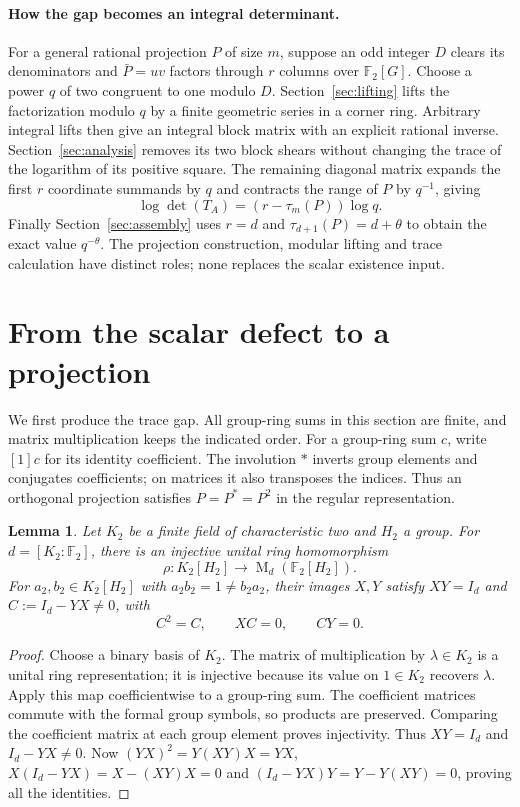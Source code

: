 \documentclass[11pt]{article}
\newtheorem{lemma}[theorem]{Lemma}
\theoremstyle{remark}
\numberwithin{equation}{section}
\newcommand{\F}{\mathbb F}
\newcommand{\Mat}{\operatorname{M}}
\begin{document}
\paragraph{How the gap becomes an integral determinant.}
For a general rational projection $P$ of size $m$, suppose an odd
integer $D$ clears its denominators and $\bar P=uv$ factors through
$r$ columns over $\F_2[G]$. Choose a power $q$ of two congruent to
one modulo $D$. Section~\ref{sec:lifting} lifts the factorization modulo $q$
by a finite geometric series in a corner ring. Arbitrary integral
lifts then give an integral block matrix with an explicit rational
inverse. Section~\ref{sec:analysis} removes its two block shears
without changing the trace of the logarithm of its positive square.
The remaining diagonal matrix expands the first $r$ coordinate
summands by $q$ and contracts the range of
$P$ by $q^{-1}$, giving
\[
 \log\det(T_A)=(r-\tau_m(P))\log q.
\]
Finally Section~\ref{sec:assembly} uses $r=d$ and
$\tau_{d+1}(P)=d+\theta$ to obtain the exact value $q^{-\theta}$.
The projection construction, modular lifting and trace calculation
have distinct roles; none replaces the scalar existence input.

\section{From the scalar defect to a projection}
\label{sec:projection}

We first produce the trace gap. All group-ring sums in this section
are finite, and matrix multiplication keeps the indicated order.
For a group-ring sum $c$, write $[1]c$ for its identity coefficient.
The involution $*$ inverts group elements and conjugates coefficients;
on matrices it also transposes the indices. Thus an orthogonal
projection satisfies $P=P^*=P^2$ in the regular representation.

\begin{lemma}\label{lem:binary}
Let $K_2$ be a finite field of characteristic two and $H_2$ a group.
For $d=[K_2:\F_2]$, there is an injective unital ring homomorphism
\[
 \rho:K_2[H_2]\longrightarrow\Mat_d(\F_2[H_2]).
\]
For $a_2,b_2\in K_2[H_2]$ with $a_2b_2=1\ne b_2a_2$, their images $X,Y$ satisfy
$XY=I_d$ and $C:=I_d-YX\ne0$, with
\begin{equation}\label{eq:defect}
 C^2=C,\qquad XC=0,\qquad CY=0.
\end{equation}
\end{lemma}

\begin{proof}
Choose a binary basis of $K_2$. The matrix of multiplication by
$\lambda\in K_2$ is a unital ring representation; it is injective
because its value on $1\in K_2$ recovers $\lambda$. Apply this map
coefficientwise to a group-ring sum. The coefficient matrices
commute with the formal group symbols, so products are preserved.
Comparing the coefficient matrix at each group element proves
injectivity. Thus $XY=I_d$ and $I_d-YX\ne0$. Now
$(YX)^2=Y(XY)X=YX$, $X(I_d-YX)=X-(XY)X=0$ and
$(I_d-YX)Y=Y-Y(XY)=0$, proving all the identities.
\end{proof}
\end{document}
